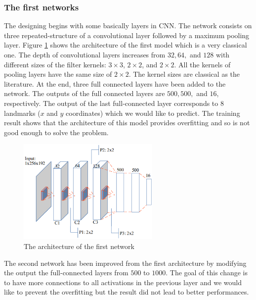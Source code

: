 \documentclass{article} %
\begin{document}
\begin{multicols}{2}
\subsubsection{The first networks}
The designing begins with some basically layers in CNN. The network consists on three repeated-structure of a convolutional layer followed by a maximum pooling layer. Figure \ref{figarch0} shows the architecture of the first model which is a very classical one. The depth of convolutional layers increases from $32, 64,$ and $128$ with different sizes of the filter kernels: $3 \times 3$, $2 \times 2$, and $2 \times 2$. All the kernels of pooling layers have the same size of $2 \times 2$. The kernel sizes are classical as the literature. At the end, three full connected layers have been added to the network. The outputs of the full connected layers are $500, 500,$ and $16$, respectively. The output of the last full-connected layer corresponds to 8 landmarks ($x$ and $y$ coordinates) which we would like to predict. The training result shows that the architecture of this model provides overfitting and so is not good enough to solve the problem.

\begin{figure}[H]
	\centerline{\includegraphics[height=2in]{images/architecture1.eps}}
	\caption{\footnotesize{The architecture of the first network}}
	\label{figarch0}
\end{figure}

The second network has been improved from the first architecture by modifying the output the full-connected layers from $500$ to $1000$. The goal of this change is to have more connections to all activations in the previous layer and we would like to prevent the overfitting but the result did not lead to better performances.


\end{multicols}
\end{document}
